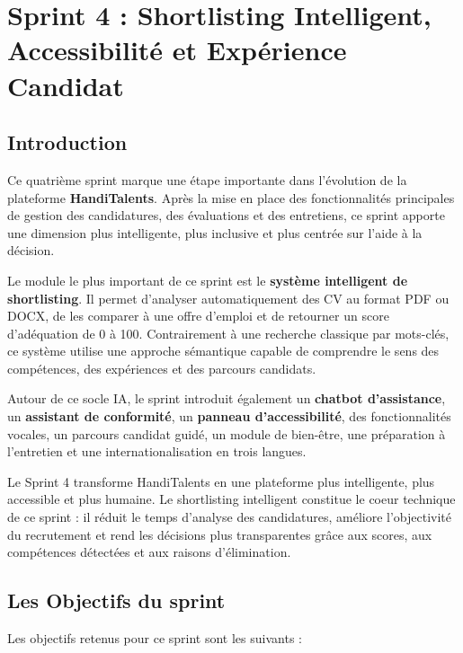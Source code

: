\documentclass[12pt,a4paper]{report}
\begin{document}
\chapter{Sprint 4 : Shortlisting Intelligent, Accessibilité et Expérience Candidat}

\section{Introduction}

Ce quatrième sprint marque une étape importante dans l'évolution de la plateforme \textbf{HandiTalents}. Après la mise en place des fonctionnalités principales de gestion des candidatures, des évaluations et des entretiens, ce sprint apporte une dimension plus intelligente, plus inclusive et plus centrée sur l'aide à la décision.

Le module le plus important de ce sprint est le \textbf{système intelligent de shortlisting}. Il permet d'analyser automatiquement des CV au format PDF ou DOCX, de les comparer à une offre d'emploi et de retourner un score d'adéquation de 0 à 100. Contrairement à une recherche classique par mots-clés, ce système utilise une approche sémantique capable de comprendre le sens des compétences, des expériences et des parcours candidats.

Autour de ce socle IA, le sprint introduit également un \textbf{chatbot d'assistance}, un \textbf{assistant de conformité}, un \textbf{panneau d'accessibilité}, des fonctionnalités vocales, un parcours candidat guidé, un module de bien-être, une préparation à l'entretien et une internationalisation en trois langues.

\begin{infobox}
Le Sprint 4 transforme HandiTalents en une plateforme plus intelligente, plus accessible et plus humaine. Le shortlisting intelligent constitue le coeur technique de ce sprint : il réduit le temps d'analyse des candidatures, améliore l'objectivité du recrutement et rend les décisions plus transparentes grâce aux scores, aux compétences détectées et aux raisons d'élimination.
\end{infobox}

\section{Les Objectifs du sprint}

Les objectifs retenus pour ce sprint sont les suivants :
\end{document}
